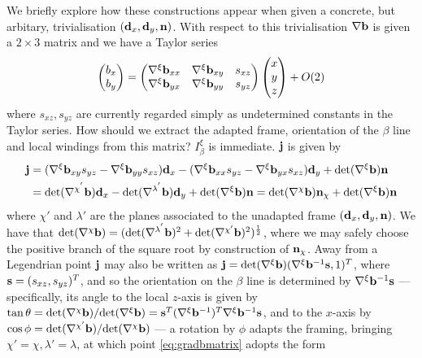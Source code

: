 {We briefly explore how these constructions appear when given a concrete, but arbitary, trivialisation $(\mathbf{d}_x,\mathbf{d}_y,\mathbf{n})$. With respect to this trivialisation $\nabla \mathbf{b}$ is given a $2\times3$ matrix and we have a Taylor series
\begin{align}
\begin{pmatrix}b_x \\ b_y\end{pmatrix} = 
\begin{pmatrix} 
    \nabla^\xi \mathbf{b}_{xx} & \nabla^\xi \mathbf{b}_{xy} & s_{xz}\\
    \nabla^\xi \mathbf{b}_{yx} & \nabla^\xi \mathbf{b}_{yy} & s_{yz}\\ 
\end{pmatrix}
\begin{pmatrix}x \\ y \\ z \end{pmatrix}  
+ O(2)
\label{eq:gradbmatrix}
\end{align}
where $s_{xz},s_{yz}$ are currently regarded simply as undetermined constants in the Taylor series. How should we extract the adapted frame, orientation of the $\beta$ line and local windings from this matrix? $I_\beta^\xi$ is immediate. $\mathbf{j}$ is given by
\begin{align}
    \mathbf{j} &= (\nabla^\xi \mathbf{b}_{xy}s_{yz} - \nabla^\xi \mathbf{b}_{yy}s_{xz})\mathbf{d}_x -( \nabla^\xi \mathbf{b}_{xx}s_{yz} - \nabla^\xi \mathbf{b}_{yx}s_{xz})\mathbf{d}_y + \mathrm{det}(\nabla^\xi \mathbf{b}) \mathbf{n} \\
         &= \mathrm{det}(\nabla^{\chi^{'}} \mathbf{b})\mathbf{d}_x  -\mathrm{det}(\nabla^{\lambda^{'}} \mathbf{b})\mathbf{d}_y + \mathrm{det}(\nabla^\xi \mathbf{b}) \mathbf{n} = \mathrm{det}(\nabla^{\chi}\mathbf{b})\mathbf{n}_\chi + \mathrm{det}(\nabla^\xi \mathbf{b}) \mathbf{n}
\end{align}
where $\chi'$ and $\lambda'$ are the planes associated to the unadapted frame $(\mathbf{d}_x,\mathbf{d}_y, \mathbf{n})$. We have that $\mathrm{det}(\nabla^{\chi} \mathbf{b})= (\mathrm{det}(\nabla^{\lambda^{'}} \mathbf{b})^2 + \mathrm{det}(\nabla^{\chi'}\mathbf{b})^2)^\frac{1}{2}$, where we may safely choose the positive branch of the square root by construction of $\mathbf{n}_\chi$. Away from a Legendrian point $\mathbf{j}$ may also be written as $\mathbf{j} = \mathrm{det}(\nabla^\xi \mathbf{b})(\nabla^\xi \mathbf{b}^{-1}\mathbf{s},1)^T$, where $\mathbf{s} = (s_{xz}, s_{yz})^T$, and so the orientation on the $\beta$ line is determined by $\nabla^\xi \mathbf{b}^{-1} \mathbf{s}$ --- specifically, its angle to the local $z$-axis is given by $\tan\theta = \mathrm{det}(\nabla^{\chi}\mathbf{b})/ \mathrm{det}(\nabla^{\xi}\mathbf{b})= \mathbf{s}^T (\nabla^\xi \mathbf{b}^{-1})^T \nabla^\xi \mathbf{b}^{-1} \mathbf{s}$, and to the $x$-axis by $\cos \phi =\mathrm{det}(\nabla^{\chi'}\mathbf{b}) /\mathrm{det}(\nabla^{\chi}\mathbf{b})$ --- a rotation by $\phi$ adapts the framing, bringing $\chi'=\chi, \lambda' = \lambda$, at which point \eqref{eq:gradbmatrix} adopts the form
}
